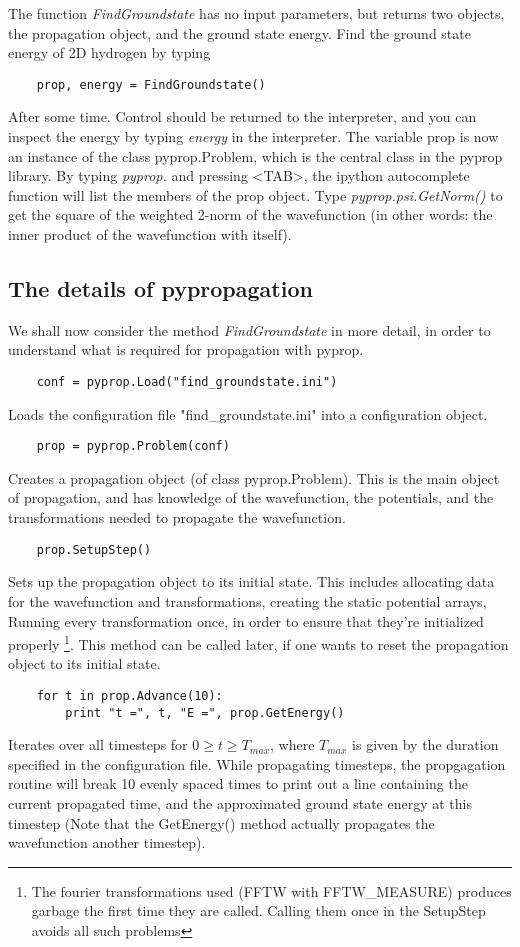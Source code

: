 The function \textit{FindGroundstate} has no input parameters, but returns two objects, the propagation object, and the 
ground state energy. Find the ground state energy of 2D hydrogen by typing
\begin{verbatim}
	prop, energy = FindGroundstate()
\end{verbatim}
After some time. Control should be returned to the interpreter, and you can inspect the energy by typing \textit{energy} in
the interpreter. The variable prop is now an instance of the class pyprop.Problem, which is the central class in the
pyprop library. By typing \textit{pyprop.} and pressing <TAB>, the ipython autocomplete function will list the members of
the prop object. Type \textit{pyprop.psi.GetNorm()} to get the square of the weighted 2-norm of the wavefunction (in other 
words: the inner product of the wavefunction with itself).

\subsection{The details of pypropagation}
We shall now consider the method \textit{FindGroundstate} in more detail, in order to understand what is required for 
propagation with pyprop.
\begin{verbatim}
	conf = pyprop.Load("find_groundstate.ini")
\end{verbatim}
Loads the configuration file "find\_groundstate.ini" into a configuration object. 
\begin{verbatim}
	prop = pyprop.Problem(conf)
\end{verbatim}
Creates a propagation object (of class pyprop.Problem). This is the main object of propagation, and has knowledge of 
the wavefunction, the potentials, and the transformations needed to propagate the wavefunction. 
\begin{verbatim}
	prop.SetupStep()
\end{verbatim}
Sets up the propagation object to its initial state. This includes allocating data for the wavefunction and transformations,
creating the static potential arrays, Running every transformation once, in order to ensure that they're initialized properly
\footnote{The fourier transformations used (FFTW with FFTW\_MEASURE) produces garbage the first time they are called. Calling
them once in the SetupStep avoids all such problems}. This method can be called later, if one wants to reset the propagation
object to its initial state.
\begin{verbatim}
	for t in prop.Advance(10):
	    print "t =", t, "E =", prop.GetEnergy()
\end{verbatim}
Iterates over all timesteps for $0 \ge t \ge T_{max}$, where $T_{max}$ is given by the duration specified in the 
configuration file. While propagating timesteps, the propgagation routine will break 10 evenly spaced times to print
out a line containing the current propagated time, and the approximated ground state energy at this timestep (Note 
that the GetEnergy() method actually propagates the wavefunction another timestep).

